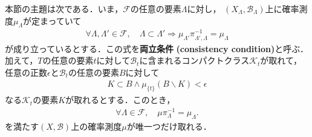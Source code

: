 	本節の主題は次である．いま，$\mathscr{F}$の任意の要素$\Lambda$に対し，
	$(X_\Lambda,\mathscr{B}_\Lambda)$上に確率測度$\mu_\Lambda$が定まっていて
	\begin{align}
		\forall \Lambda,\Lambda' \in \mathscr{F},\quad
		\Lambda \subset \Lambda' \Longrightarrow
		\mu_{\Lambda'} \pi_{\Lambda',\Lambda}^{-1}
		= \mu_\Lambda
	\end{align}
	が成り立っているとする．この式を{\bf 両立条件}
	{\bf (consistency condition)}と呼ぶ．
	加えて，$T$の任意の要素$t$に対して$\mathscr{B}_t$に含まれるコンパクトクラス$\mathcal{K}_t$が取れて，
	任意の正数$\epsilon$と$\mathscr{B}_t$の任意の要素$B$に対して
	\begin{align}
		K \subset B \wedge \mu_{\{t\}}(B \backslash K) < \epsilon
	\end{align}
	なる$\mathcal{K}_t$の要素$K$が取れるとする．このとき，
	\begin{align}
		\forall \Lambda \in \mathscr{F},\quad 
		\mu \pi_{\Lambda}^{-1} = \mu_\Lambda.
	\end{align}
	を満たす$(X,\mathscr{B})$上の確率測度$\mu$が唯一つだけ取れる．
	
